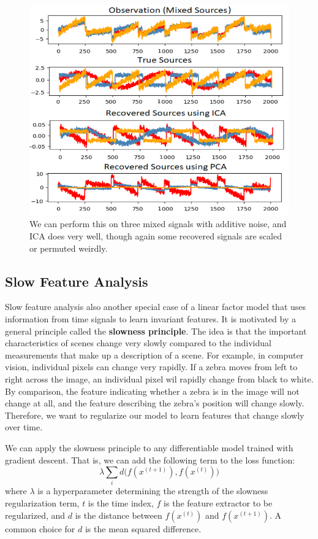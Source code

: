 \documentclass{article}
\begin{document}
  \begin{figure}[H]
    \centering 
    \includegraphics[scale=0.4]{img/ICA_example.png}
    \caption{We can perform this on three mixed signals with additive noise, and ICA does very well, though again some recovered signals are scaled or permuted weirdly. }
    \label{fig:}
  \end{figure}

\subsection{Slow Feature Analysis}

  Slow feature analysis also another special case of a linear factor model that uses information from time signals to learn invariant features. It is motivated by a general principle called the \textbf{slowness principle}. The idea is that the important characteristics of scenes change very slowly compared to the individual measurements that make up a description of a scene. For example, in computer vision, individual pixels can change very rapidly. If a zebra moves from left to right across the image, an individual pixel wil rapidly change from black to white. By comparison, the feature indicating whether a zebra is in the image will not change at all, and the feature describing the zebra's position will change slowly. Therefore, we want to regularize our model to learn features that change slowly over time.  

  We can apply the slowness principle to any differentiable model trained with gradient descent. That is, we can add the following term to the loss function: 
  \begin{equation}
    \lambda \sum_i d\big( f(x^{(t+1)}), f(x^{(t)}) \big)
  \end{equation}
  where $\lambda$ is a hyperparameter determining the strength of the slowness regularization term, $t$ is the time index, $f$ is the feature extractor to be regularized, and $d$ is the distance between $f(x^{(t)})$ and $f(x^{(t+1)})$. A common choice for $d$ is the mean squared difference. 
\end{document}
